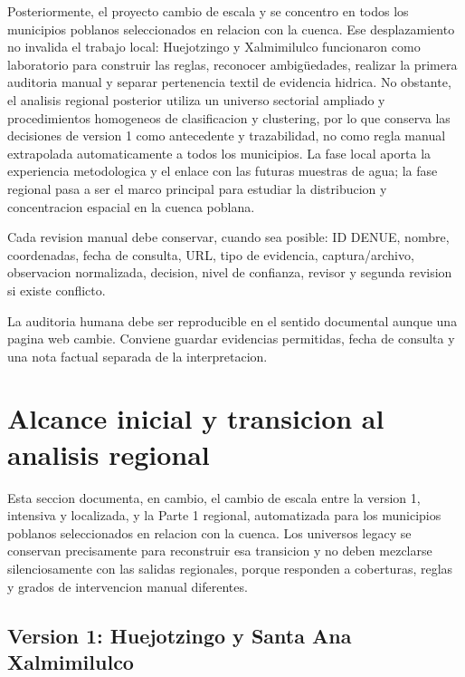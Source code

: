 \documentclass[11pt,letterpaper]{article}
\begin{document}
Posteriormente, el proyecto cambio de escala y se concentro en todos los municipios poblanos seleccionados en relacion con la cuenca. Ese desplazamiento no invalida el trabajo local: Huejotzingo y Xalmimilulco funcionaron como laboratorio para construir las reglas, reconocer ambigüedades, realizar la primera auditoria manual y separar pertenencia textil de evidencia hidrica. No obstante, el analisis regional posterior utiliza un universo sectorial ampliado y procedimientos homogeneos de clasificacion y clustering, por lo que conserva las decisiones de version 1 como antecedente y trazabilidad, no como regla manual extrapolada automaticamente a todos los municipios. La fase local aporta la experiencia metodologica y el enlace con las futuras muestras de agua; la fase regional pasa a ser el marco principal para estudiar la distribucion y concentracion espacial en la cuenca poblana.

\begin{evidencia}
Cada revision manual debe conservar, cuando sea posible: ID DENUE, nombre, coordenadas, fecha de consulta, URL, tipo de evidencia, captura/archivo, observacion normalizada, decision, nivel de confianza, revisor y segunda revision si existe conflicto.
\end{evidencia}

\begin{trazabilidad}
La auditoria humana debe ser reproducible en el sentido documental aunque una pagina web cambie. Conviene guardar evidencias permitidas, fecha de consulta y una nota factual separada de la interpretacion.
\end{trazabilidad}

\section{Alcance inicial y transicion al analisis regional}

Esta seccion documenta, en cambio, el cambio de escala entre la version 1, intensiva y localizada, y la Parte 1 regional, automatizada para los municipios poblanos seleccionados en relacion con la cuenca. Los universos legacy se conservan precisamente para reconstruir esa transicion y no deben mezclarse silenciosamente con las salidas regionales, porque responden a coberturas, reglas y grados de intervencion manual diferentes.

\subsection{Version 1: Huejotzingo y Santa Ana Xalmimilulco}
\end{document}
